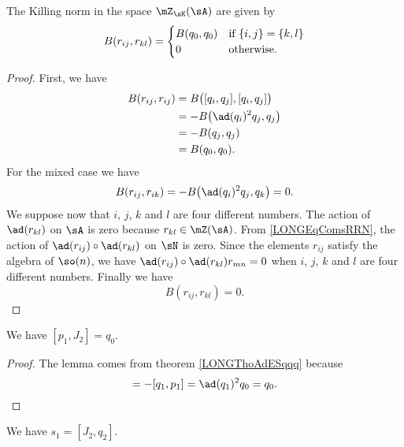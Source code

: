 \begin{proposition}
	The Killing norm in the space $\mZ_{\sK}(\sA)$ are given by
	\begin{equation}
		B(r_{ij},r_{kl})=\begin{cases}
			B(q_0,q_0)	&	\text{if $\{ i,j \}=\{ k,l \}$}\\
			0	&	 \text{\text{otherwise}}.
		\end{cases}
	\end{equation}
\end{proposition}

\begin{proof}
	First, we have
	\begin{equation}
		\begin{aligned}[]
			B(r_{ij},r_{ij})&=B\big( [q_i,q_j],[q_i,q_j] \big)\\
					&=-B\big( \ad(q_i)^2q_j,q_j \big)\\
					&=-B(q_j,q_j)\\
					&=B(q_0,q_0).
		\end{aligned}
	\end{equation}
	For the mixed case we have
	\begin{equation}	
			B(r_{ij},r_{ik})=-B\big( \ad(q_i)^2q_j,q_k \big)=0.
	\end{equation}
	We suppose now that $i$, $j$, $k$ and $l$ are four different numbers. The action of $\ad(r_{kl})$ on $\sA$ is zero because $r_{kl}\in\mZ(\sA)$. From \eqref{LONGEqComsRRN}, the action of $\ad(r_{ij})\circ\ad(r_{kl})$ on $\sN$ is zero. Since the elements $r_{ij}$ satisfy the algebra of $\so(n)$, we have $\ad(r_{ij})\circ\ad(r_{kl})r_{mn}=0$ when $i$, $j$, $k$ and $l$ are four different numbers. Finally we have
	\begin{equation}
		B(r_{ij},r_{kl})=0.
	\end{equation}
\end{proof}

\begin{lemma}		\label{LONGLempunjdeuxqzero}
	We have $[p_1,J_2]=q_0$.
\end{lemma}

\begin{proof}
	The lemma comes from theorem \ref{LONGThoAdESqqq} because
	\begin{equation}
		[p_1,J_2]=-[q_1,p_1]=\ad(q_1)^2q_0=q_0.
	\end{equation}
\end{proof}

\begin{lemma}				 \label{LONGlemJDeuxqDeuxsUn}
	We have $s_1=[J_2,q_2]$.
\end{lemma}

